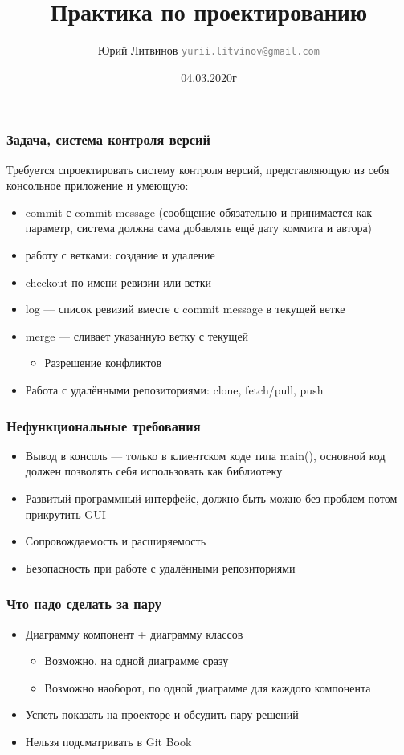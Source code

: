 \documentclass[xetex,mathserif,serif]{beamer}
\title{Практика по проектированию}
\author[Юрий Литвинов]{Юрий Литвинов \newline \textcolor{gray}{\small\texttt{yurii.litvinov@gmail.com}}}
\date{04.03.2020г}
\begin{document}
	
	\frame{\titlepage}

	\begin{frame}
		\frametitle{Задача, система контроля версий}
		Требуется спроектировать систему контроля версий, представляющую из себя консольное приложение и умеющую:
		\begin{itemize}
			\item commit с commit message (сообщение обязательно и принимается как параметр, система должна сама добавлять ещё дату коммита и автора)
			\item работу с ветками: создание и удаление
			\item checkout по имени ревизии или ветки
			\item log --- список ревизий вместе с commit message в текущей ветке
			\item merge --- сливает указанную ветку с текущей
			\begin{itemize}
				\item Разрешение конфликтов
			\end{itemize}
			\item Работа с удалёнными репозиториями: clone, fetch/pull, push
		\end{itemize}
	\end{frame}

	\begin{frame}
		\frametitle{Нефункциональные требования}
		\begin{itemize}
			\item Вывод в консоль --- только в клиентском коде типа main(), основной код должен позволять себя использовать как библиотеку
			\item Развитый программный интерфейс, должно быть можно без проблем потом прикрутить GUI
			\item Сопровождаемость и расширяемость
			\item Безопасность при работе с удалёнными репозиториями
		\end{itemize}
	\end{frame}

	\begin{frame}
		\frametitle{Что надо сделать за пару}
		\begin{itemize}
			\item Диаграмму компонент + диаграмму классов
			\begin{itemize}
				\item Возможно, на одной диаграмме сразу
				\item Возможно наоборот, по одной диаграмме для каждого компонента
			\end{itemize}
			\item Успеть показать на проекторе и обсудить пару решений
			\item Нельзя подсматривать в Git Book
		\end{itemize}
	\end{frame}
\end{document}
